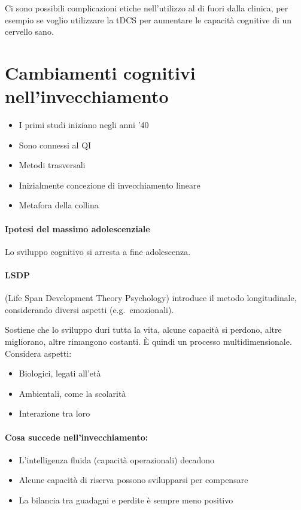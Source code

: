 \documentclass[12pt, a4paper]{article}
\begin{document}
Ci sono possibili complicazioni etiche nell'utilizzo al di fuori dalla clinica, per esempio se voglio utilizzare la tDCS per aumentare le capacità cognitive di un cervello sano.

\section{Cambiamenti cognitivi nell'invecchiamento}

\begin{itemize}
    \item I primi studi iniziano negli anni '40
    \item Sono connessi al QI
    \item Metodi trasversali
    \item Inizialmente concezione di invecchiamento lineare
    \item Metafora della collina
\end{itemize}

\paragraph{Ipotesi del massimo adolescenziale}  Lo sviluppo cognitivo si arresta a fine adolescenza.

\paragraph{LSDP}  (Life Span Development Theory Psychology) introduce il metodo longitudinale, considerando diversi aspetti (e.g.\ emozionali).

Sostiene che lo sviluppo duri tutta la vita, alcune capacità si perdono, altre migliorano, altre rimangono costanti. È quindi un processo multidimensionale.\\
Considera aspetti:
\begin{itemize}
    \item Biologici, legati all'età
    \item Ambientali, come la scolarità
    \item Interazione tra loro
\end{itemize}

\paragraph{Cosa succede nell'invecchiamento:}
\begin{itemize}
    \item L'intelligenza fluida (capacità operazionali) decadono
    \item Alcune capacità di riserva possono svilupparsi per compensare
    \item La bilancia tra guadagni e perdite è sempre meno positivo
\end{itemize}
\end{document}
